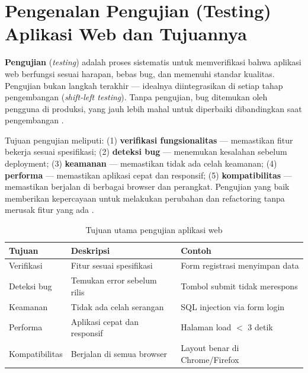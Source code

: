 \section{Pengenalan Pengujian (Testing) Aplikasi Web dan Tujuannya}

\textbf{Pengujian} (\textit{testing}) adalah proses sistematis untuk memverifikasi bahwa aplikasi web berfungsi sesuai harapan, bebas bug, dan memenuhi standar kualitas. Pengujian bukan langkah terakhir --- idealnya diintegrasikan di setiap tahap pengembangan (\textit{shift-left testing}). Tanpa pengujian, bug ditemukan oleh pengguna di produksi, yang jauh lebih mahal untuk diperbaiki dibandingkan saat pengembangan \cite{mdnToolsTesting}.

Tujuan pengujian meliputi: (1) \textbf{verifikasi fungsionalitas} --- memastikan fitur bekerja sesuai spesifikasi; (2) \textbf{deteksi bug} --- menemukan kesalahan sebelum deployment; (3) \textbf{keamanan} --- memastikan tidak ada celah keamanan; (4) \textbf{performa} --- memastikan aplikasi cepat dan responsif; (5) \textbf{kompatibilitas} --- memastikan berjalan di berbagai browser dan perangkat. Pengujian yang baik memberikan kepercayaan untuk melakukan perubahan dan refactoring tanpa merusak fitur yang ada \cite{mdnToolsTesting}.

\begin{table}[ht]
\centering
\begin{tabular}{|P{3cm}|P{4.5cm}|P{5cm}|}
\hline
\textbf{Tujuan} & \textbf{Deskripsi} & \textbf{Contoh} \\
\hline
Verifikasi & Fitur sesuai spesifikasi & Form registrasi menyimpan data \\
\hline
Deteksi bug & Temukan error sebelum rilis & Tombol submit tidak merespons \\
\hline
Keamanan & Tidak ada celah serangan & SQL injection via form login \\
\hline
Performa & Aplikasi cepat dan responsif & Halaman load $<$ 3 detik \\
\hline
Kompatibilitas & Berjalan di semua browser & Layout benar di Chrome/Firefox \\
\hline
\end{tabular}
\caption{Tujuan utama pengujian aplikasi web}
\end{table}

